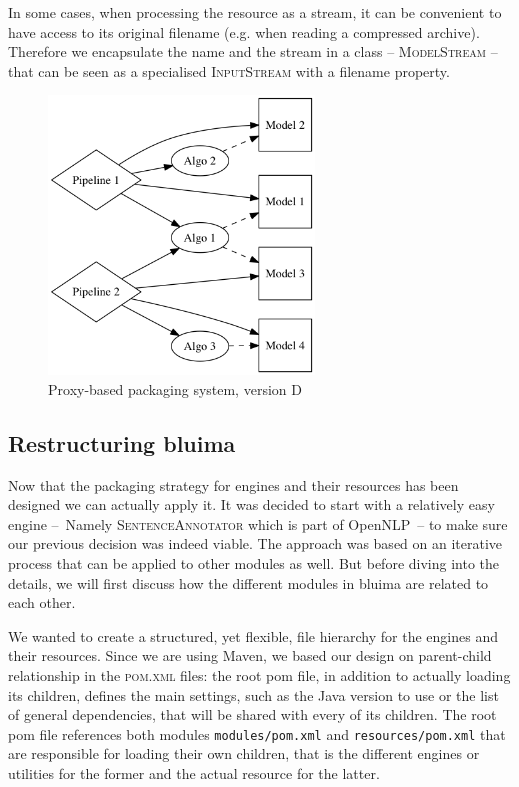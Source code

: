 \documentclass{article}
\newcommand{\ID}[1]{{\textsc{#1}}}
\newcommand{\PATH}[1]{\mbox{\texttt{#1}}}
\begin{document}
\begin{appendices}
In some cases, when processing the resource as a stream, it can be convenient to have access to its
original filename (e.g. when reading a compressed archive). Therefore we encapsulate the name and
the stream in a class -- \ID{ModelStream} -- that can be seen as a specialised \ID{InputStream} with
a filename property.

\begin{figure}
    \centering
    \includegraphics[width=200pt]{res/packaging_version_D.png}
    \caption{Proxy-based packaging system, version D}
    \label{fig:pkgsysD}
\end{figure}


\subsection{Restructuring bluima}
\label{sec:restructuring_bluima}

Now that the packaging strategy for engines and their resources has been designed we can actually
apply it. It was decided to start with a relatively easy engine --~Namely \ID{SentenceAnnotator}
which is part of OpenNLP~-- to make sure our previous decision was indeed viable. The approach was
based on an iterative process that can be applied to other modules as well. But before diving into
the details, we will first discuss how the different modules in bluima are related to each other.

We wanted to create a structured, yet flexible, file hierarchy for the engines and their resources.
Since we are using Maven, we based our design on parent-child relationship in the \ID{pom.xml}
files: the root pom file, in addition to actually loading its children, defines the main settings,
such as the Java version to use or the list of general dependencies, that will be shared with every
of its children. The root pom file references both modules \PATH{modules/pom.xml} and
\PATH{resources/pom.xml} that are responsible for loading their own children, that is the different
engines or utilities for the former and the actual resource for the latter.


\end{appendices}
\end{document}
